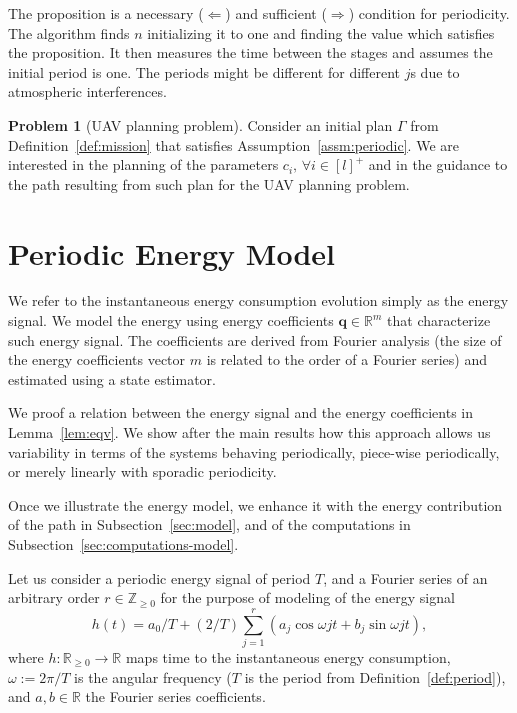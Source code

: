 \documentclass[letterpaper,10pt,conference]{ieeeconf}
\theoremstyle{definition}
\newtheorem{pb}{Problem}[section]
\begin{document}
The proposition is a necessary ($\Longleftarrow$) and sufficient ($\Longrightarrow$) condition for periodicity. The algorithm finds $n$ initializing it to one and finding the value which satisfies the proposition. It then measures the time between the stages and assumes the initial period is one. The periods might be different for different $j$s due to atmospheric interferences.

\begin{pb}[UAV planning problem]\label{pb}
  Consider an initial plan $\Gamma$ from Definition~\ref{def:mission} that satisfies Assumption~\ref{assm:periodic}. We are interested in the planning of the parameters $c_i,\,\forall i\in[l]^+$ and in the guidance to the path resulting from such plan for the UAV planning problem.
\end{pb}


\section{Periodic Energy Model}  %
\label{sec:energy-model}         %
We refer to the instantaneous energy consumption evolution simply as the energy signal. We model the energy using energy coefficients $\mathbf{q}\in\mathbb{R}^m$ that characterize such energy signal. The coefficients are derived from Fourier analysis (the size of the energy coefficients vector $m$ is related to the order of a Fourier series) and estimated using a state estimator. %

We proof a relation between the energy signal and the energy coefficients in Lemma~\ref{lem:eqv}. We show after the main results how this approach allows us variability in terms of the systems behaving periodically, piece-wise periodically, or merely linearly with sporadic periodicity.

Once we illustrate the energy model, we enhance it with the energy contribution of the path in Subsection~\ref{sec:model}, and of the computations in Subsection~\ref{sec:computations-model}. 

Let us consider a periodic energy signal of period $T$, and a Fourier series of an arbitrary order $r\in\mathbb{Z}_{\geq 0}$ for the purpose of modeling of the energy signal
\begin{equation}\label{eq:fourier}
  h(t)=a_0/T+(2/T)\sum_{j=1}^{r}{\left(a_j\cos{\omega jt}+b_j\sin{\omega jt}\right)},
\end{equation}
where $h:\mathbb{R}_{\geq 0}\rightarrow\mathbb{R}$ maps time to the instantaneous energy consumption, $\omega:=2\pi/T$ is the angular frequency ($T$ is the period from Definition~\ref{def:period}), and $a,b\in\mathbb{R}$ the Fourier series coefficients.
\end{document}
